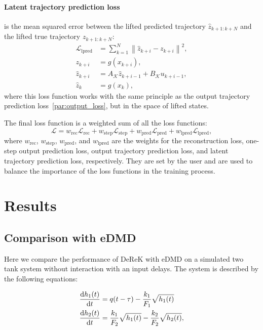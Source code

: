 \documentclass[conference]{IEEEtran}
\newcommand{\ui}[2]{#1_{\text{#2}}}
\begin{document}
\paragraph*{Latent trajectory prediction loss}
is the mean squared error between the lifted predicted trajectory $\hat{z}_{k+1:k+N}$ and the lifted true trajectory $z_{k+1:k+N}$:
\begin{subequations}
    \begin{align}
        \mathcal{L}_{\text{lpred}} &= \sum_{k=1}^{N}\left\|\hat{z}_{k+i} - z_{k+i}\right\|^2, \\
        z_{k+i} &= g(x_{k+i}), \\
        \hat{z}_{k+i} &= A_{\mathcal{K}}\hat{z}_{k+i-1}+B_{\mathcal{K}}u_{k+i-1},\\
        \hat{z}_{k} &= g(x_{k}),
    \end{align}
\end{subequations}
where this loss function works with the same principle as the output trajectory prediction loss~\ref{par:output_loss}, but in the space of lifted states.

The final loss function is a weighted sum of all the loss functions:
\begin{equation}
    \mathcal{L} = \ui{w}{rec}\mathcal{L}_{\text{rec}} + \ui{w}{step}\mathcal{L}_{\text{step}} + \ui{w}{pred}\mathcal{L}_{\text{pred}} + \ui{w}{lpred}\mathcal{L}_{\text{lpred}},
\end{equation}
where $\ui{w}{rec}$, $\ui{w}{step}$, $\ui{w}{pred}$, and $\ui{w}{lpred}$ are the weights for the reconstruction loss, one-step output prediction loss, output trajectory prediction loss, and latent trajectory prediction loss, respectively. They are set by the user and are used to balance the importance of the loss functions in the training process.


\section{Results}

\subsection{Comparison with eDMD}

Here we compare the performance of DeReK with eDMD on a simulated two tank system without interaction with an input delays. The system is described by the following equations:

\begin{equation}\label{eq:two_tanks_system}
    \begin{aligned}
        \diff{h_1(t)}{t} & = q(t-\tau) - \frac{k_1}{F_1}\sqrt{h_1(t)}                     \\
        \diff{h_2(t)}{t} & = \frac{k_1}{F_2}\sqrt{h_1(t)} - \frac{k_2}{F_2}\sqrt{h_2(t)},
    \end{aligned}
\end{equation}
\end{document}

